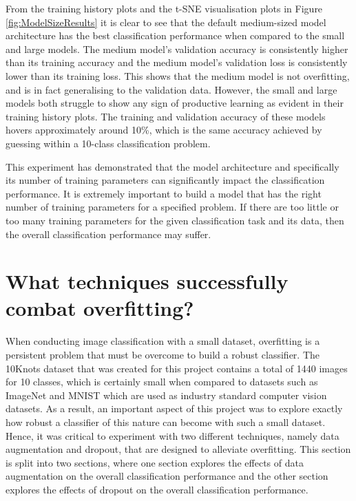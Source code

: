 \documentclass{l4proj}
\begin{document}
From the training history plots and the t-SNE visualisation plots in Figure \ref{fig:ModelSizeResults} it is clear to see that the default medium-sized model architecture has the best classification performance when compared to the small and large models. The medium model's validation accuracy is consistently higher than its training accuracy and the medium model's validation loss is consistently lower than its training loss. This shows that the medium model is not overfitting, and is in fact generalising to the validation data. However, the small and large models both struggle to show any sign of productive learning as evident in their training history plots. The training and validation accuracy of these models hovers approximately around 10\%, which is the same accuracy achieved by guessing within a 10-class classification problem.

This experiment has demonstrated that the model architecture and specifically its number of training parameters can significantly impact the classification performance. It is extremely important to build a model that has the right number of training parameters for a specified problem. If there are too little or too many training parameters for the given classification task and its data, then the overall classification performance may suffer.

\section{What techniques successfully combat overfitting?}
When conducting image classification with a small dataset, overfitting is a persistent problem that must be overcome to build a robust classifier.
The 10Knots dataset that was created for this project contains a total of 1440 images for 10 classes, which is certainly small when compared to datasets such as ImageNet\cite{imagenet_cvpr09} and MNIST\cite{lecun-mnisthandwrittendigit-2010} which are used as industry standard computer vision datasets.
As a result, an important aspect of this project was to explore exactly how robust a classifier of this nature can become with such a small dataset.
Hence, it was critical to experiment with two different techniques, namely data augmentation and dropout, that are designed to alleviate overfitting.
This section is split into two sections, where one section explores the effects of data augmentation on the overall classification performance and the other section explores the effects of dropout on the overall classification performance.
\end{document}
